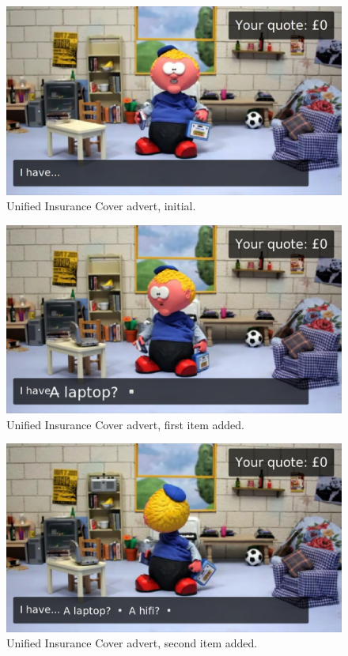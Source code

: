 	\begin{figure}[th]
		\centering
		\includegraphics[width=\textwidth,height=0.5\textheight,keepaspectratio]{images/adverts/unified_insurance_cover-1.png}
		\caption{Unified Insurance Cover advert, initial.}
		\label{fig:Paddy1}
	\end{figure}

	\begin{figure}[th]
		\centering
		\includegraphics[width=\textwidth,height=0.5\textheight,keepaspectratio]{images/adverts/unified_insurance_cover-2.png}
		\caption{Unified Insurance Cover advert, first item added.}
		\label{fig:Paddy2}
	\end{figure}

	\begin{figure}[th]
		\centering
		\includegraphics[width=\textwidth,height=0.5\textheight,keepaspectratio]{images/adverts/unified_insurance_cover-3.png}
		\caption{Unified Insurance Cover advert, second item added.}
		\label{fig:Paddy3}
	\end{figure}

